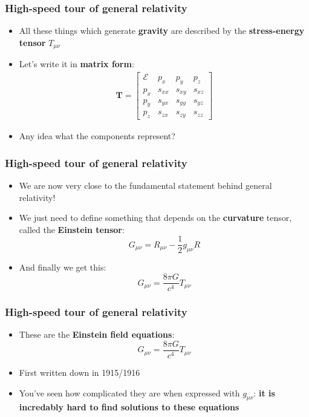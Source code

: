\documentclass{beamer}
\begin{document}
\begin{frame}
  \frametitle{High-speed tour of general relativity}
  \begin{itemize}
    \item<1-> All these things which generate \textbf{gravity} are described by the \textbf{stress-energy tensor} $T_{\mu\nu}$
    \item<2-> Let's write it in \textbf{matrix form}:
      \begin{align*}
	\mathbf{T}=
	\begin{bmatrix}
	  \mathcal{  E} & p_x & p_y & p_z \\
	  p_x & s_{xx} & s_{xy} & s_{xz} \\
	  p_y & s_{yx} & s_{yy} & s_{yz} \\
	  p_z & s_{zx} & s_{zy} & s_{zz} 
	\end{bmatrix}
      \end{align*}
    \item<3-> Any idea what the components represent?
  \end{itemize}
\end{frame}

\begin{frame}
  \frametitle{High-speed tour of general relativity}
  \begin{itemize}
    \item<1-> We are now very close to the fundamental statement behind general relativity!
    \item<2-> We just need to define something that depends on the \textbf{curvature} tensor, called the \textbf{Einstein tensor}:
      \begin{equation*}
	G_{\mu\nu}=R_{\mu\nu}-\frac{1}{2}g_{\mu\nu}R
      \end{equation*}
    \item<3-> And finally we get this:
      \begin{equation*}
	G_{\mu\nu}=\frac{8\pi G}{c^4}T_{\mu\nu}
      \end{equation*}
  \end{itemize}
\end{frame}

\begin{frame}
  \frametitle{High-speed tour of general relativity}
  \begin{itemize}
    \item<1-> These are the \textbf{Einstein field equations}:
      \begin{equation*}
	G_{\mu\nu}=\frac{8\pi G}{c^4}T_{\mu\nu}
      \end{equation*}
    \item<2-> First written down in 1915/1916
    \item<3-> You've seen how complicated they are when expressed with $g_{\mu\nu}$: \textbf{it is incredably hard to find solutions to these equations}
  \end{itemize}
\end{frame}
\end{document}
